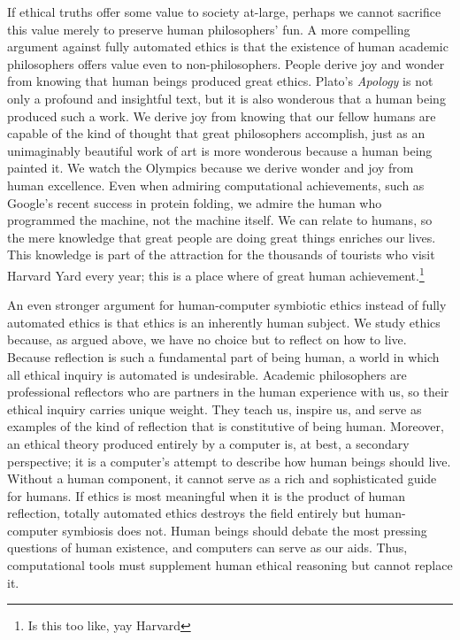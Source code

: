 \begin{isabellebody}
\begin{isamarkuptext}
If ethical truths offer some value to society at-large, perhaps we cannot sacrifice this value merely 
to preserve human philosophers’ fun. A more compelling argument against fully automated 
ethics is that the existence of human academic philosophers offers value even to non-philosophers. 
People derive joy and wonder from knowing that human beings produced great ethics. Plato’s \emph{Apology} 
is not only a profound and insightful text, but it is also wonderous that a human being produced such 
a work. We derive joy from knowing that our fellow humans are capable of the kind of thought that 
great philosophers accomplish, just as an unimaginably beautiful work of art is more wonderous 
because a human being painted it. We watch the Olympics because we derive wonder and joy from human 
excellence. Even when admiring computational achievements, such as Google’s recent success in protein 
folding, we admire the human who programmed the machine, not the machine itself. We can relate to 
humans, so the mere knowledge that great people are doing great things enriches our lives. This 
knowledge is part of the attraction for the thousands of tourists who visit Harvard Yard every year; 
this is a place where of great human achievement.\footnote{Is this too like, yay Harvard}

An even stronger argument for human-computer symbiotic ethics instead of fully automated ethics is 
that ethics is an inherently human subject. We study ethics because, as argued above, we 
have no choice but to reflect on how to live. Because reflection is such a fundamental part of being 
human, a world in which all ethical inquiry is automated is undesirable. Academic philosophers are 
professional reflectors who are partners in the human experience with us, so their ethical inquiry 
carries unique weight. They teach us, inspire us, and serve as examples of the kind of reflection 
that is constitutive of being human. Moreover, an ethical theory produced entirely by a computer is, 
at best, a secondary perspective; it is a computer’s attempt to describe how human beings should live. 
Without a human component, it cannot serve as a rich and sophisticated guide for humans. If ethics is 
most meaningful when it is the product of human reflection, totally automated ethics destroys the field 
entirely but human-computer symbiosis does not. Human beings should debate the most pressing questions 
of human existence, and computers can serve as our aids. Thus, computational tools must supplement 
human ethical reasoning but cannot replace it.%
\end{isamarkuptext}\isamarkuptrue%
%
\isadelimtheory
%
\endisadelimtheory
%
\isatagtheory
%
\endisatagtheory
{\isafoldtheory}%
%
\isadelimtheory
%
\endisadelimtheory
%
\end{isabellebody}%
